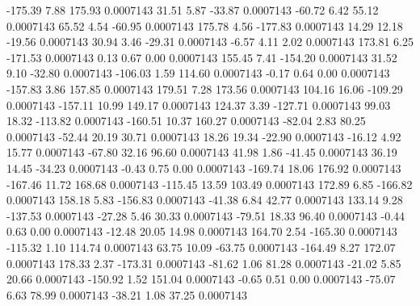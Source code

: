      -175.39        7.88      175.93     0.0007143
       31.51        5.87      -33.87     0.0007143
      -60.72        6.42       55.12     0.0007143
       65.52        4.54      -60.95     0.0007143
      175.78        4.56     -177.83     0.0007143
       14.29       12.18      -19.56     0.0007143
       30.94        3.46      -29.31     0.0007143
       -6.57        4.11        2.02     0.0007143
      173.81        6.25     -171.53     0.0007143
        0.13        0.67        0.00     0.0007143
      155.45        7.41     -154.20     0.0007143
       31.52        9.10      -32.80     0.0007143
     -106.03        1.59      114.60     0.0007143
       -0.17        0.64        0.00     0.0007143
     -157.83        3.86      157.85     0.0007143
      179.51        7.28      173.56     0.0007143
      104.16       16.06     -109.29     0.0007143
     -157.11       10.99      149.17     0.0007143
      124.37        3.39     -127.71     0.0007143
       99.03       18.32     -113.82     0.0007143
     -160.51       10.37      160.27     0.0007143
      -82.04        2.83       80.25     0.0007143
      -52.44       20.19       30.71     0.0007143
       18.26       19.34      -22.90     0.0007143
      -16.12        4.92       15.77     0.0007143
      -67.80       32.16       96.60     0.0007143
       41.98        1.86      -41.45     0.0007143
       36.19       14.45      -34.23     0.0007143
       -0.43        0.75        0.00     0.0007143
     -169.74       18.06      176.92     0.0007143
     -167.46       11.72      168.68     0.0007143
     -115.45       13.59      103.49     0.0007143
      172.89        6.85     -166.82     0.0007143
      158.18        5.83     -156.83     0.0007143
      -41.38        6.84       42.77     0.0007143
      133.14        9.28     -137.53     0.0007143
      -27.28        5.46       30.33     0.0007143
      -79.51       18.33       96.40     0.0007143
       -0.44        0.63        0.00     0.0007143
      -12.48       20.05       14.98     0.0007143
      164.70        2.54     -165.30     0.0007143
     -115.32        1.10      114.74     0.0007143
       63.75       10.09      -63.75     0.0007143
     -164.49        8.27      172.07     0.0007143
      178.33        2.37     -173.31     0.0007143
      -81.62        1.06       81.28     0.0007143
      -21.02        5.85       20.66     0.0007143
     -150.92        1.52      151.04     0.0007143
       -0.65        0.51        0.00     0.0007143
      -75.07        6.63       78.99     0.0007143
      -38.21        1.08       37.25     0.0007143
